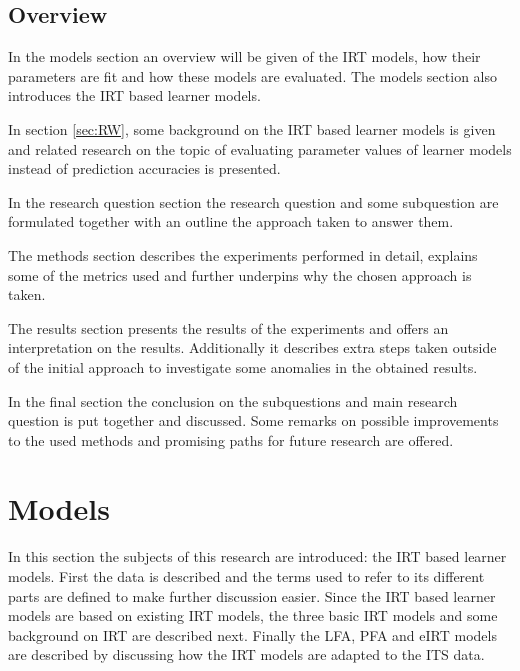 \documentclass{scrartcl}
\begin{document}
\subsection{Overview}
In the models section an overview will be given of the IRT models, how their parameters are fit and how these models are evaluated. The models section also introduces the IRT based learner models.

In section \ref{sec:RW}, some background on the IRT based learner models is given and related research on the topic of evaluating parameter values of learner models instead of prediction accuracies is presented.

In the research question section the research question and some subquestion are formulated together with an outline the approach taken to answer them.

The methods section describes the experiments performed in detail, explains some of the metrics used and further underpins why the chosen approach is taken.

The results section presents the results of the experiments and offers an interpretation on the results. Additionally it describes extra steps taken outside of the initial approach to investigate some anomalies in the obtained results.

In the final section the conclusion on the subquestions and main research question is put together and discussed. Some remarks on possible improvements to the used methods and promising paths for future research are offered.

\section{Models}
In this section the subjects of this research are introduced: the IRT based learner models. First the data is described and the terms used to refer to its different parts are defined to make further discussion easier. Since the IRT based learner models are based on existing IRT models, the three basic IRT models and some background on IRT are described next. Finally the LFA, PFA and eIRT models are described by discussing how the IRT models are adapted to the ITS data.
\end{document}

